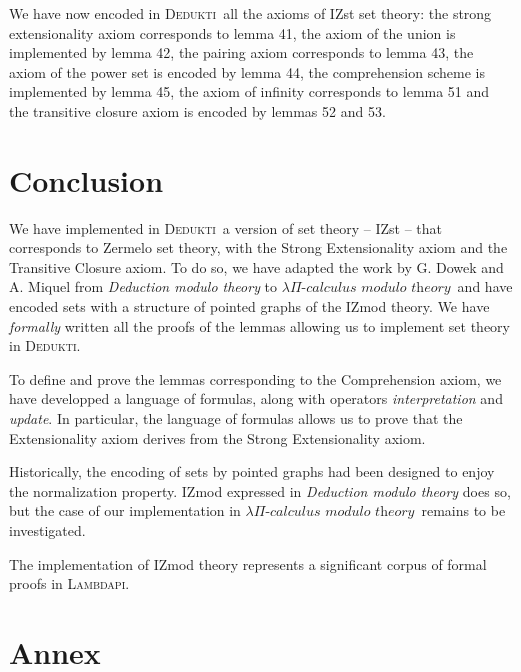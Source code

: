\documentclass[submission,copyright,creativecommons]{eptcs}
\newcommand{\dedukti}{\textsc{Dedukti}}
\newcommand{\lpcm}{$\lambda \Pi\textit{-calculus modulo theory}$}
\begin{document}
We have now encoded in \dedukti ~all the axioms of IZst set theory: the strong extensionality axiom corresponds to lemma 41, the axiom of the union is implemented by lemma 42, the pairing axiom corresponds to lemma 43, the axiom of the power set is encoded by lemma 44, the comprehension scheme is implemented by lemma 45, the axiom of infinity corresponds to lemma 51 and the transitive closure axiom is encoded by lemmas 52 and 53.


\section{Conclusion}

We have implemented in \dedukti ~a version of set theory -- IZst -- that corresponds to Zermelo set theory, with the Strong Extensionality axiom and the Transitive Closure axiom. To do so, we have adapted the work by G. Dowek and A. Miquel \cite{zermodulo} from \textit{Deduction modulo theory} to \lpcm ~and have encoded sets with a structure of pointed graphs of the IZmod theory. We have \textit{formally} written all the proofs of the lemmas allowing us to implement set theory in \dedukti.

To define and prove the lemmas corresponding to the Comprehension axiom, we have developped a language of formulas, along with operators \textit{interpretation} and \textit{update}. In particular, the language of formulas allows us to prove that the Extensionality axiom derives from the Strong Extensionality axiom.

Historically, the encoding of sets by pointed graphs had been designed to enjoy the normalization property. IZmod expressed in \textit{Deduction modulo theory} does so, but the case of our implementation in \lpcm ~remains to be investigated.

The implementation of IZmod theory represents a significant corpus of formal proofs in \textsc{Lambdapi}.

\newpage
\section*{Annex}
\end{document}
